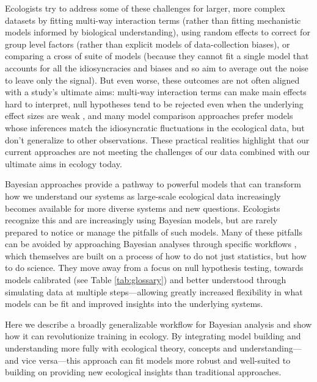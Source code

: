 \documentclass[11pt]{article}
\begin{document}
{Ecologists try to address some of these challenges for larger, more complex datasets by fitting multi-way interaction terms (rather than fitting mechanistic models informed by biological understanding), using random effects to correct for group level factors (rather than explicit models of data-collection biases), or comparing a cross of suite of models (because they cannot fit a single model that accounts for all the idiosyncracies and biases and so aim to average out the noise to leave only the signal).
But even worse, these outcomes are not often aligned with a study's ultimate aims:  multi-way interaction terms can make main effects hard to interpret, null hypotheses tend to be rejected even when the underlying effect sizes are weak \citep{gelmanhill,muff2022rewriting}, and many model comparison approaches prefer models whose inferences match the idiosyncratic fluctuations in the ecological data, but don’t generalize to other observations. These practical realities highlight that our current approaches are not meeting the challenges of our data combined with our ultimate aims in ecology today.

Bayesian approaches provide a pathway to powerful models that can transform how we understand our systems as large-scale ecological data increasingly becomes available for more diverse systems and new questions. Ecologists recognize this and are increasingly using Bayesian models, but are rarely prepared to notice or manage the pitfalls of such models. Many of these pitfalls can be avoided by approaching Bayesian analyses through specific workflows \citep{betanworkflow,vandeschoot2021}, which themselves are built on a process of how to do not just statistics, but how to do science. %
They move away from a focus on null hypothesis testing, towards models calibrated (see Table \ref{tab:glossary}) and better understood through simulating data at multiple steps---allowing greatly increased flexibility in what models can be fit and improved insights into the underlying systems.

Here we describe a broadly generalizable workflow for Bayesian analysis and show how it can revolutionize training in ecology. By integrating model building and understanding more fully with ecological theory, concepts and understanding---and vice versa---this approach can fit models more robust and well-suited to building on providing new ecological insights than traditional approaches. 
% 

}
\end{document}
